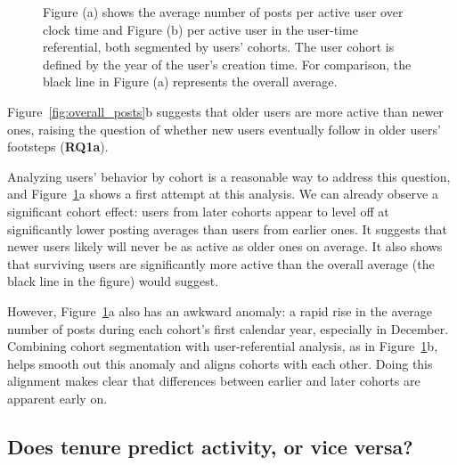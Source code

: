 \begin{figure}[!tb]
\centering
{}
\caption{Figure (a) shows the average number of posts per active user over clock time and Figure (b) per active user in the user-time referential, both segmented by users' cohorts. The user cohort is defined by the year of the user's creation time.  For comparison, the black line in Figure (a) represents the overall average.}
\label{fig:avr_posts_per_user_over_time_cohorts}
\end{figure}

Figure~\ref{fig:overall_posts}b suggests that older users are more active than newer ones, raising the question of whether new users
eventually follow in older users' footsteps (\textbf{RQ1a}).  

Analyzing users' behavior by cohort is a reasonable way to address this question, and Figure~\ref{fig:avr_posts_per_user_over_time_cohorts}a shows a first attempt at this analysis.  We can already observe a significant cohort effect: users from later cohorts appear to level off at significantly lower posting averages than users from earlier ones.  It suggests that newer users likely will never be as active as older ones on average.  It also shows that surviving users are significantly more active than the overall average (the black line in the figure) would suggest.

However, Figure~\ref{fig:avr_posts_per_user_over_time_cohorts}a also has an awkward anomaly: a rapid rise in the average number of posts during each cohort's first calendar year, especially in December. Combining cohort segmentation with user-referential analysis, as in Figure~\ref{fig:avr_posts_per_user_over_time_cohorts}b, helps smooth out this anomaly and aligns cohorts with each other.  Doing this alignment makes clear that differences between earlier and later cohorts are apparent early on.

\subsection{Does tenure predict activity, or vice versa?}

